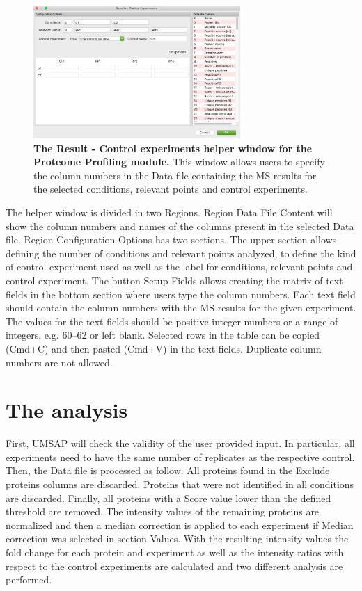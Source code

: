 \begin{figure}[h]
	\centering
	\includegraphics[width=0.7\textwidth]{./IMAGES/MOD-PROTPROF/protprof-rescontrol.jpg}
	\caption[The Result - Control experiments helper window for the Proteome Profiling module]{\textbf{The Result - Control experiments helper window for the Proteome Profiling module.} This window allows users to specify the column numbers in the Data file containing the MS results for the selected conditions, relevant points and control experiments.} 
	\label{fig:protprofResControlWindow}
	\vspace{-5pt} 	
\end{figure}

The helper window is divided in two Regions. Region Data File Content will show the 
column numbers and names of the columns present in the selected Data file. Region
Configuration Options has two sections. The upper section allows defining the number
of conditions and relevant points analyzed, to define the kind of control experiment
used as well as the label for conditions, relevant points and control experiment.
The button Setup Fields allows creating the matrix of text fields in the bottom section
where users type the column numbers. Each text field should contain the column
numbers with the MS results for the given experiment. The values for the text fields
should be positive integer numbers or a range of integers, e.g. 
\numrange[range-phrase=--]{60}{62} or left blank. Selected rows in the table can
be copied (Cmd+C) and then pasted (Cmd+V) in the text fields. Duplicate column numbers
are not allowed. 

\section{The analysis}
\label{sec:protprofTTest}

First, UMSAP will check the validity of the user provided input. In particular, all experiments need to have the same number of replicates as the respective control. Then, the Data file is processed as follow. All proteins found in the Exclude proteins columns are discarded. Proteins that were not identified in all conditions are discarded. Finally, all proteins with a Score value lower than the defined threshold are removed. The intensity values of the remaining proteins are normalized and then a median correction is applied to each experiment if Median correction was selected in section Values. With the resulting intensity values the fold change for each protein and experiment as well as the intensity ratios with respect to the control experiments are calculated and two different analysis are performed.

